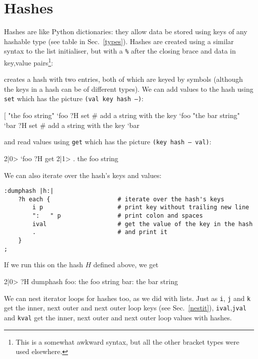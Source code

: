 \section{Hashes}
\label{hashes}
Hashes are like Python dictionaries: they allow data be stored using keys of any hashable type (see table in Sec.~\ref{types}).
Hashes are created
using a similar syntax to the list initialiser, but with a \texttt{\%} after
the closing brace and data in key,value pairs\footnote{This is a somewhat
awkward syntax, but all the other bracket types were used elsewhere.}:
\indw{[\%]}
\end{v}
creates a hash with two entries, both of which are keyed by symbols (although
the keys in a hash can be of different types). We can add values to the hash
using \texttt{set} which has the picture \texttt{(val key hash --)}:

\begin{v}
[%
"the foo string" `foo ?H set    # add a string with the key `foo
"the bar string" `bar ?H set    # add a string with the key `bar
\end{v}
and read values using \texttt{get} which has the picture \texttt{(key hash -- val)}:
\begin{v}
2|0> `foo ?H get
2|1> .
the foo string
\end{v}
We can also iterate over the hash's keys and values:
\begin{lstlisting}
:dumphash |h:|
    ?h each {                   # iterate over the hash's keys
        i p                     # print key without trailing new line
        ":   " p                # print colon and spaces
        ival                    # get the value of the key in the hash
        .                       # and print it
    }
;
\end{lstlisting}
If we run this on the hash $H$ defined above, we get
\begin{v}
2|0> ?H dumphash
foo:   the foo string
bar:   the bar string
\end{v}
We can nest iterator loops for hashes too, as we did with lists.
Just as \texttt{i}, \texttt{j} and \texttt{k} get the inner, next outer
and next outer loop keys (see Sec.~\ref{nestit}), \texttt{ival},\texttt{jval} and \texttt{kval} get
the inner, next outer and next outer loop values with hashes.


